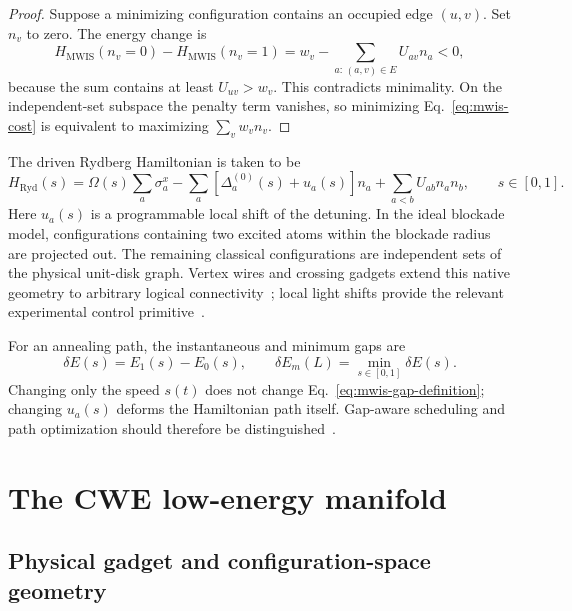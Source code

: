 \begin{proof}
Suppose a minimizing configuration contains an occupied edge $(u,v)$.  Set
$n_v$ to zero.  The energy change is
\begin{equation}
 H_{\mathrm{MWIS}}(n_v=0)-H_{\mathrm{MWIS}}(n_v=1)
 =w_v-\sum_{a:\,(a,v)\in E}U_{av}n_a<0,
\end{equation}
because the sum contains at least $U_{uv}>w_v$.  This contradicts
minimality.  On the independent-set subspace the penalty term vanishes, so
minimizing Eq.~\eqref{eq:mwis-cost} is equivalent to maximizing
$\sum_vw_vn_v$.
\end{proof}

The driven Rydberg Hamiltonian is taken to be
\begin{equation}
 H_{\mathrm{Ryd}}(s)
 =\Omega(s)\sum_{a}\sigma_a^x
 -\sum_a[\Delta_a^{(0)}(s)+u_a(s)]n_a
 +\sum_{a<b}U_{ab}n_an_b,
 \qquad s\in[0,1].
 \label{eq:mwis-rydberg}
\end{equation}
Here $u_a(s)$ is a programmable local shift of the detuning.  In the ideal
blockade model, configurations containing two excited atoms within the
blockade radius are projected out.  The remaining classical configurations
are independent sets of the physical unit-disk graph.  Vertex wires and
crossing gadgets extend this native geometry to arbitrary logical
connectivity~\cite{nguyen2023quantum}; local light shifts provide the relevant
experimental control primitive~\cite{oliveira2025demonstration}.

For an annealing path, the instantaneous and minimum gaps are
\begin{equation}
 \delta E(s)=E_1(s)-E_0(s),\qquad
 \delta E_m(L)=\min_{s\in[0,1]}\delta E(s).
 \label{eq:mwis-gap-definition}
\end{equation}
Changing only the speed $s(t)$ does not change Eq.~\eqref{eq:mwis-gap-definition};
changing $u_a(s)$ deforms the Hamiltonian path itself.  Gap-aware scheduling
and path optimization should therefore be distinguished~\cite{zeng2016schedule,jeong2026enhanced}.

\section{The CWE low-energy manifold}
\label{sec:mwis-cwe-manifold}

\subsection{Physical gadget and configuration-space geometry}

